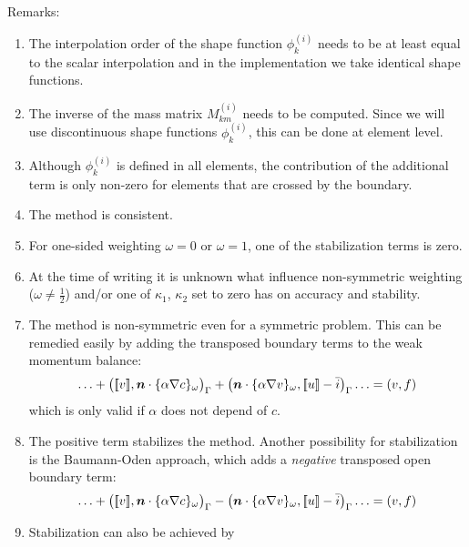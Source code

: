 Remarks:
\begin{enumerate}
   \item The interpolation order of the shape function $\phi^{(i)}_k$
 needs to be at
least equal to the scalar interpolation and in the implementation we
 take identical shape functions.
   \item The inverse of the mass matrix $M^{(i)}_{km}$ needs to be computed.
 Since we
will use discontinuous shape functions $\phi^{(i)}_k$, this can be done at
element level.
   \item Although $\phi^{(i)}_k$ is defined in all elements,
 the contribution of the
additional term is only non-zero for elements that are crossed by the boundary.
   \item The method is consistent.
   \item For one-sided weighting $\omega=0$ or $\omega=1$, one of the
         stabilization terms is zero.
   \item At the time of writing it is unknown what influence
         non-symmetric weighting ($\omega\neq\frac12$) 
         and/or one of $\kappa_1$, $\kappa_2$ set to zero has on 
         accuracy and stability.
\item
The method is non-symmetric even for a symmetric problem.
This can be remedied
easily by adding the transposed boundary terms to the
weak momentum balance:
\begin{equation}
\ldots
        +\big(\text{[\![} v\text{]\!]},\boldsymbol{n}\cdot\{\alpha\nabla c\}_\omega\big)_{\Gamma}\\
    +\big(\boldsymbol{n}\cdot\{\alpha\nabla v\}_\omega,\text{[\![} u\text{]\!]}-\bar i\big)_{\Gamma}\\
         \ldots =(v,f)
   \label{eq:interfacediffusiontranposed}
\end{equation}
which is only valid if $\alpha$ does not depend of $c$.
   \item The positive term stabilizes the method. Another possibility for
stabilization is the Baumann-Oden approach, which adds a \emph{negative}
         transposed open boundary term:
\begin{equation}
  \ldots
        +\big(\text{[\![} v\text{]\!]},\boldsymbol{n}\cdot\{\alpha\nabla c\}_\omega\big)_{\Gamma}\\
    -\big(\boldsymbol{n}\cdot\{\alpha\nabla v\}_\omega,\text{[\![} u\text{]\!]}-\bar i\big)_{\Gamma}\\
  \ldots
         =(v,f)
   \label{eq:interfacediffusionBaumann}
\end{equation}
  \item
Stabilization can also be achieved by 

\end{enumerate}
